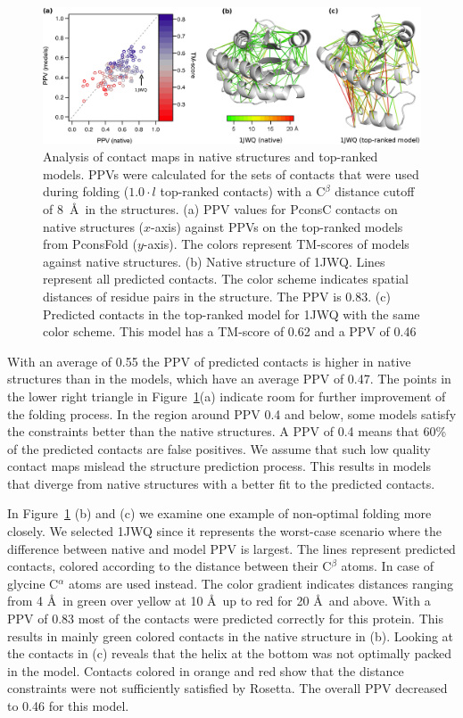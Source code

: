\documentclass{bioinfo}
\begin{document}
\begin{figure}[!tpb]%
\centerline{\includegraphics[scale=0.7]{figures/qa.eps}}
\caption{Analysis of contact maps in native structures and
top-ranked models. PPVs were calculated for the sets of contacts that
were used during folding ($1.0 \cdot l$ top-ranked contacts) with a
C$^\beta$ distance cutoff of 8~\AA\ in the structures. (a) PPV values for PconsC contacts on native structures 
($x$-axis) against PPVs on the top-ranked models from PconsFold 
($y$-axis). The colors represent TM-scores of models against native
structures. (b) Native structure of 1JWQ. Lines represent all predicted contacts. The color 
scheme indicates spatial distances of residue pairs in the 
structure. The PPV is 0.83. (c) Predicted contacts in the top-ranked 
model for 1JWQ with the same color scheme. This model has a TM-score 
of 0.62 and a PPV of 0.46}\label{fig:qa}
\end{figure}

With an average of 0.55 the
PPV of predicted contacts is higher in native structures than in the models, which have an
average PPV of 0.47. The points in the lower right
triangle in Figure~\ref{fig:qa}(a) indicate room for further improvement
of the folding process. In the region around PPV 0.4 and below,
some models satisfy the constraints better than the native
structures. A PPV of 0.4 means that 60\% of the predicted contacts 
are false positives. We assume that such low quality contact maps
mislead the structure prediction process. This results in models that
diverge from native structures with a better fit to the predicted
contacts. 


In Figure~\ref{fig:qa} (b) and (c) we examine one example of
non-optimal folding more closely. We selected 1JWQ since it 
represents the worst-case scenario where the difference between 
native and model PPV is largest. The lines represent predicted 
contacts, colored according to the distance between their C$^{\beta}$
atoms. In case of glycine C$^{\alpha}$ atoms are used instead. The
color gradient indicates distances ranging from 4 \AA\ in green over
yellow at 10 \AA\ up to red for 20 \AA\ and above. With a PPV of
0.83 most of the contacts were predicted correctly for this
protein. This results in mainly green colored contacts in the native
structure in (b). Looking at the contacts in (c) reveals that the
helix at the bottom was not optimally packed in the model. Contacts
colored in orange and red show that the distance constraints were not
sufficiently satisfied by Rosetta. The overall PPV decreased to 0.46
for this model.
\end{document}
